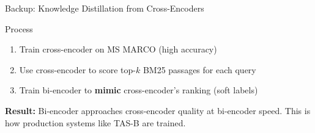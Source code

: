 \documentclass[aspectratio=169]{beamer}
\begin{document}
\begin{frame}[fragile]{Backup: Knowledge Distillation from Cross-Encoders}
\begin{center}
\end{center}

\vspace{0.5em}

\begin{block}{Process}
\begin{enumerate}
    \item Train cross-encoder on MS MARCO (high accuracy)
    \item Use cross-encoder to score top-$k$ BM25 passages for each query
    \item Train bi-encoder to \textbf{mimic} cross-encoder's ranking (soft labels)
\end{enumerate}
\end{block}

\textbf{Result:} Bi-encoder approaches cross-encoder quality at bi-encoder speed. This is how production systems like TAS-B are trained.
\end{frame}
\end{document}
